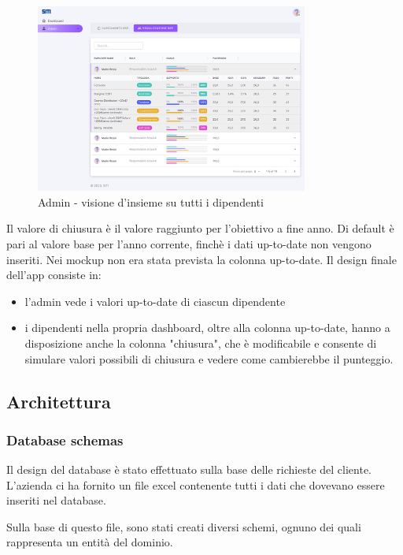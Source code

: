 \begin{figure}[h]
    \centering
    \includegraphics[width=0.8\textwidth]{res/dati.png}
    \caption{Admin - visione d'insieme su tutti i dipendenti}
    \label{fig:dati}
\end{figure}


Il valore di chiusura è il valore raggiunto per l'obiettivo a fine anno. Di default è pari al valore base per l'anno corrente, finchè i dati up-to-date non vengono inseriti.
Nei mockup non era stata prevista la colonna up-to-date. Il design finale dell'app consiste in:
\begin{itemize}
    \item l'admin vede i valori up-to-date di ciascun dipendente
    \item i dipendenti nella propria dashboard, oltre alla colonna up-to-date, hanno a disposizione anche la colonna "chiusura", che è modificabile e consente di simulare valori possibili di chiusura e vedere come cambierebbe il punteggio.
\end{itemize}



\subsection*{Architettura}

\subsubsection{Database schemas}

Il design del database è stato effettuato sulla base delle richieste del cliente.
L'azienda ci ha fornito un file excel contenente tutti i dati che dovevano essere inseriti nel database.

Sulla base di questo file, sono stati creati diversi schemi, ognuno dei quali rappresenta un entità del dominio.

